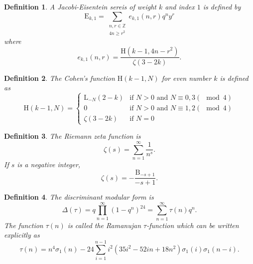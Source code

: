 \documentclass[uplatex,dvipdfmx]{jsarticle}
\newtheorem{definition}{Definition}[section]
\begin{document}
\begin{definition}
    A Jacobi-Eisentein sereis of weight
    $k$
    and index
    $1$
    is defined by
    \begin{equation}
        \mathrm{E}_{k, 1}
        =
        \sum_{\substack{n, r \in \mathbb{Z} \\ 4n \geq r^2}}
        e_{k, 1}(n, r)
        q^n y^r
    \end{equation}
    where
    \begin{equation}
        e_{k, 1}(n, r)
        =
        \frac{\mathrm{H}\left( k - 1, 4n - r^2 \right)}
        {\zeta(3 - 2k)}.
    \end{equation}
\end{definition}

\begin{definition}
    The Cohen's function
    $\mathrm{H}(k - 1, N)$
    for even number
    $k$
    is defined as
    \begin{equation}
        \mathrm{H}(k - 1, N)
        =
        \begin{cases}
            \mathrm{L}_{-N}(2 - k)
            &\text{if $N > 0$ and $N \equiv 0, 3 (\mod 4)$}\\
            0
            &\text{if $N > 0$ and $N \equiv 1, 2 (\mod 4)$}\\
            \zeta(3 - 2k)
            &\text{if $N = 0$}
        \end{cases}
    \end{equation}
\end{definition}

\begin{definition}
    The Riemann zeta function is
    \begin{equation}
        \zeta (s)
        =
        \sum_{n = 1}^\infty
        \frac{1}{n^s}.
    \end{equation}
    If
    $s$
    is a negative integer,
    \begin{equation}
        \zeta(s)
        =
        - \frac{\mathrm{B}_{-s + 1}}{-s + 1}.
    \end{equation}
\end{definition}

\begin{definition}
    The discriminant modular form is
    \begin{equation}
        \Delta(\tau)
        =
        q \prod_{n = 1}^\infty (1 - q^n)^{24}
        =
        \sum_{n = 1}^\infty
        \tau (n) q^n.
    \end{equation}
    The function 
    $\tau(n)$ is called the Ramanujan $\tau$-function
    which can be written explicitly as
    \begin{equation}
        \tau(n)
        =
        n^4 \sigma_1 (n)
        - 24
        \sum_{i = 1}^{n - 1}
        i^2 (35i^2 - 52in + 18n^2)
        \sigma_1 (i)
        \sigma_1 (n - i).
    \end{equation}
\end{definition}
\end{document}
